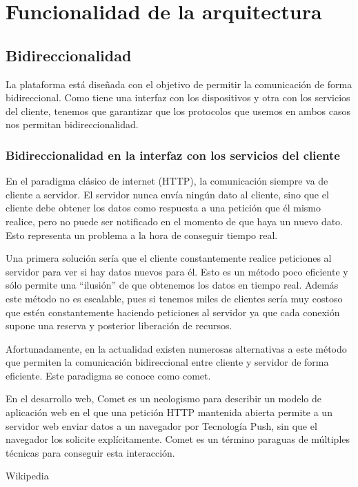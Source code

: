 \section{Funcionalidad de la arquitectura}

\subsection{Bidireccionalidad}

La plataforma está diseñada con el objetivo de permitir la comunicación de forma
bidireccional. Como tiene una interfaz con los dispositivos y otra con los
servicios del cliente, tenemos que garantizar que los protocolos que usemos en
ambos casos nos permitan bidireccionalidad.

\subsubsection{Bidireccionalidad en la interfaz con los servicios del cliente}

En el paradigma clásico de internet (HTTP), la comunicación siempre va de
cliente a servidor. El servidor nunca envía ningún dato al cliente, sino que el
cliente debe obtener los datos como respuesta a una petición que él mismo
realice, pero no puede ser notificado en el momento de que haya un nuevo dato.
Esto representa un problema a la hora de conseguir tiempo real.

Una primera solución sería que el cliente constantemente realice peticiones al
servidor para ver si hay datos nuevos para él. Esto es un método poco eficiente
y sólo permite una ``ilusión'' de que obtenemos los datos en tiempo real. Además
este método no es escalable, pues si tenemos miles de clientes sería muy costoso
que estén constantemente haciendo peticiones al servidor ya que cada conexión
supone una reserva y posterior liberación de recursos.

Afortunadamente, en la actualidad existen numerosas alternativas a este método
que permiten la comunicación bidireccional entre cliente y servidor de forma
eficiente. Este paradigma se conoce como comet.

\epigraph{En el desarrollo web, Comet es un neologismo para describir un modelo de
aplicación web en el que una petición HTTP mantenida abierta permite a un
servidor web enviar datos a un navegador por Tecnología Push, sin que el
navegador los solicite explícitamente. Comet es un término paraguas de múltiples
técnicas para conseguir esta interacción.}{Wikipedia}

